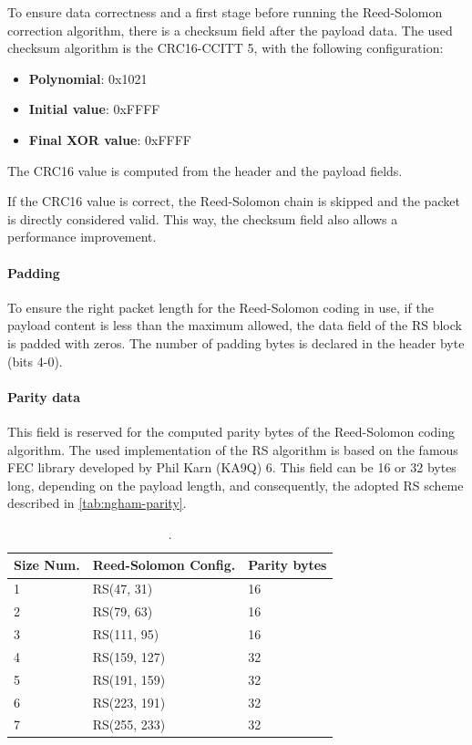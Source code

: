 To ensure data correctness and a first stage before running the Reed-Solomon correction algorithm, there is a checksum field after the payload data. The used checksum algorithm is the CRC16-CCITT 5, with the following configuration:

\begin{itemize}
    \item \textbf{Polynomial}: 0x1021
    \item \textbf{Initial value}: 0xFFFF
    \item \textbf{Final XOR value}: 0xFFFF
\end{itemize}

The CRC16 value is computed from the header and the payload fields.

If the CRC16 value is correct, the Reed-Solomon chain is skipped and the packet is directly considered valid. This way, the checksum field also allows a performance improvement.

\paragraph{Padding}

To ensure the right packet length for the Reed-Solomon coding in use, if the payload content is less than the maximum allowed, the data field of the RS block is padded with zeros. The number of padding bytes is declared in the header byte (bits 4-0).

\paragraph{Parity data}

This field is reserved for the computed parity bytes of the Reed-Solomon coding algorithm. The used implementation of the RS algorithm is based on the famous FEC library developed by Phil Karn (KA9Q) 6. This field can be 16 or 32 bytes long, depending on the payload length, and consequently, the adopted RS scheme described in \autoref{tab:ngham-parity}.

\begin{table}[!h]
    \centering
    \begin{tabular}{lll}
        \toprule[1.5pt]
        \textbf{Size Num.} & \textbf{Reed-Solomon Config.} & \textbf{Parity bytes} \\
        \midrule
        1 & RS(47, 31)   & 16 \\
        2 & RS(79, 63)   & 16 \\
        3 & RS(111, 95)  & 16 \\
        4 & RS(159, 127) & 32 \\
        5 & RS(191, 159) & 32 \\
        6 & RS(223, 191) & 32 \\
        7 & RS(255, 233) & 32 \\
        \bottomrule[1.5pt]
    \end{tabular}
    \caption{.}
    \label{tab:ngham-parity}
\end{table}


